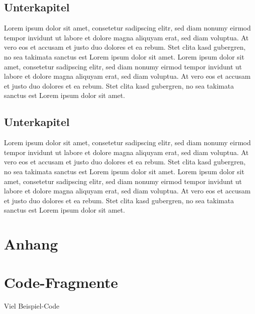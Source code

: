 \documentclass[12pt,a4paper,bibliography=totocnumbered,listof=totocnumbered]{scrartcl}
\begin{document}
\subsection{Unterkapitel}
Lorem ipsum dolor sit amet, consetetur sadipscing elitr, sed diam nonumy eirmod tempor invidunt ut labore et dolore magna aliquyam erat, sed diam voluptua. At vero eos et accusam et justo duo dolores et ea rebum. Stet clita kasd gubergren, no sea takimata sanctus est Lorem ipsum dolor sit amet. Lorem ipsum dolor sit amet, consetetur sadipscing elitr, sed diam nonumy eirmod tempor invidunt ut labore et dolore magna aliquyam erat, sed diam voluptua. At vero eos et accusam et justo duo dolores et ea rebum. Stet clita kasd gubergren, no sea takimata sanctus est Lorem ipsum dolor sit amet.

\subsection{Unterkapitel}
Lorem ipsum dolor sit amet, consetetur sadipscing elitr, sed diam nonumy eirmod tempor invidunt ut labore et dolore magna aliquyam erat, sed diam voluptua. At vero eos et accusam et justo duo dolores et ea rebum. Stet clita kasd gubergren, no sea takimata sanctus est Lorem ipsum dolor sit amet. Lorem ipsum dolor sit amet, consetetur sadipscing elitr, sed diam nonumy eirmod tempor invidunt ut labore et dolore magna aliquyam erat, sed diam voluptua. At vero eos et accusam et justo duo dolores et ea rebum. Stet clita kasd gubergren, no sea takimata sanctus est Lorem ipsum dolor sit amet.
\pagebreak

\renewcommand\refname{Quellenverzeichnis}


\pagebreak

\setcounter{page}{1}

\begin{appendix}
\section*{Anhang}
{}

\section{Code-Fragmente}
Viel Beispiel-Code

\end{appendix}
\end{document}
